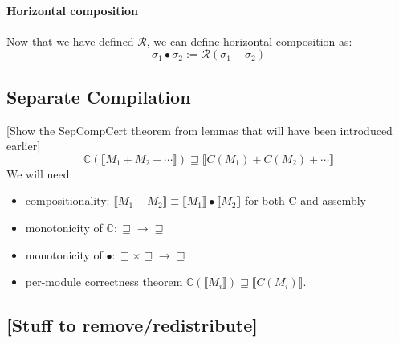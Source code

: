 \documentclass[sigplan,10pt,review,anonymous]{acmart}
\begin{document}

\paragraph{Horizontal composition} %

Now that we have defined $\mathcal{R}$,
we can define horizontal composition as:
\[
  \sigma_1 \bullet \sigma_2 := \mathcal{R}(\sigma_1 + \sigma_2)
\]



\subsection{Separate Compilation} %

[Show the SepCompCert theorem
from lemmas that will have been introduced earlier]
\[
  \mathbb{C}(\llbracket M_1 + M_2 + \cdots \rrbracket) \sqsupseteq
  \llbracket C(M_1) + C(M_2) + \cdots \rrbracket
\]
We will need:
\begin{itemize}
\item compositionality:
  $\llbracket M_1 + M_2 \rrbracket \equiv
   \llbracket M_1 \rrbracket \bullet \llbracket M_2 \rrbracket$
  for both C and assembly
\item monotonicity of $\mathbb{C} : {\sqsupseteq} \rightarrow {\sqsupseteq}$
\item monotonicity of $\bullet : {\sqsupseteq} \times {\sqsupseteq} \rightarrow {\sqsupseteq}$
\item per-module correctness theorem $\mathbb{C}(\llbracket M_i \rrbracket) \sqsupseteq \llbracket C(M_i) \rrbracket$.
\end{itemize}


\subsection{[Stuff to remove/redistribute]}
\end{document}
